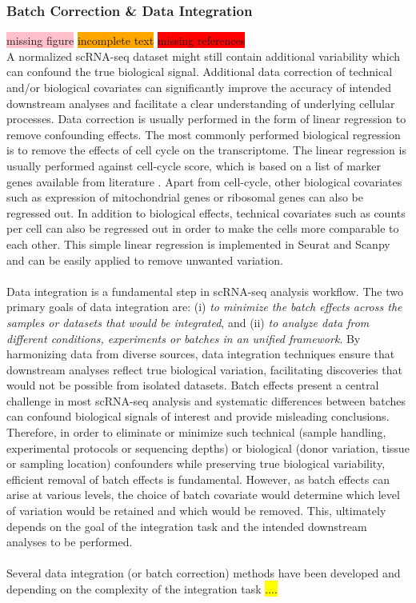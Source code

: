 \subsubsection{Batch Correction \& Data Integration} \colorbox{pink}{missing figure} \colorbox{orange}{incomplete text} \colorbox{red}{missing references}\\
A normalized scRNA-seq dataset might still contain additional variability which can confound the true biological signal. Additional data correction of technical and/or biological covariates can significantly improve the accuracy of intended downstream analyses and facilitate a clear understanding of underlying cellular processes. Data correction is usually performed in the form of linear regression to remove confounding effects. The most commonly performed biological regression is to remove the effects of cell cycle on the transcriptome. The linear regression is usually performed against cell-cycle score, which is based on a list of marker genes available from literature \textbf{\cite{macosko_highly_2015}}. Apart from cell-cycle, other biological covariates such as expression of mitochondrial genes or ribosomal genes can also be regressed out. In addition to biological effects, technical covariates such as counts per cell can also be regressed out in order to make the cells more comparable to each other. This simple linear regression is implemented in Seurat \textbf{\cite{butler_integrating_2018,stuart_comprehensive_2019,hao_integrated_2021}} and Scanpy \textbf{\cite{wolf_scanpy_2018}} and can be easily applied to remove unwanted variation.\\\\
Data integration is a fundamental step in scRNA-seq analysis workflow. The two primary goals of data integration are: (i) \textit{to minimize the batch effects across the samples or datasets that would be integrated}, and (ii) \textit{to analyze data from different conditions, experiments or batches in an unified framework}. By harmonizing data from diverse sources, data integration techniques ensure that downstream analyses reflect true biological variation, facilitating discoveries that would not be possible from isolated datasets. Batch effects present a central challenge in most scRNA-seq analysis and systematic differences between batches can confound biological signals of interest and provide misleading conclusions. Therefore, in order to eliminate or minimize such technical (sample handling, experimental protocols or sequencing depths) or biological (donor variation, tissue or sampling location) confounders while preserving true biological variability, efficient removal of batch effects is fundamental. However, as batch effects can arise at various levels, the choice of batch covariate would determine which level of variation would be retained and which would be removed. This, ultimately depends on the goal of the integration task and the intended downstream analyses to be performed.\\\\
Several data integration (or batch correction) methods have been developed and depending on the complexity of the integration task \hl{....}

